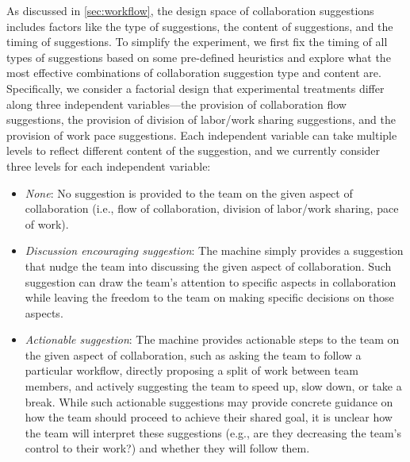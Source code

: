 As discussed in \ref{sec:workflow}, the design space of collaboration suggestions includes factors like the type of suggestions, the content of suggestions, and the timing of suggestions. To simplify the experiment, we first fix the timing of all types of suggestions based on some pre-defined heuristics and explore what the most effective combinations of collaboration suggestion type and content are. Specifically, we consider a factorial design that experimental treatments differ along three independent variables---the provision of collaboration flow suggestions, the provision of division of labor/work sharing suggestions, and the provision of work pace suggestions. Each independent variable can take multiple levels to reflect different content of the suggestion, and we currently consider three levels for each independent variable:
\begin{itemize}[leftmargin=*]
\item {\em None}: No suggestion is provided to the team on the given aspect of collaboration (i.e., flow of collaboration, division of labor/work sharing, pace of work).
\item {\em Discussion encouraging suggestion}: The machine simply provides a suggestion that nudge the team into discussing the given aspect of collaboration. %
Such suggestion can draw the team's attention to specific aspects in collaboration while leaving the freedom to the team on making specific decisions on those aspects.
\item {\em Actionable suggestion}: The machine provides actionable steps to the team on the given aspect of collaboration, such as asking the team to follow a particular workflow, directly proposing a split of work between team members, and actively suggesting the team to speed up, slow down, or take a break. While such actionable suggestions may provide concrete guidance on how the team should proceed to achieve their shared goal, it is unclear how the team will interpret these suggestions (e.g., are they decreasing the team's control to their work?) and whether they will follow them. 
\end{itemize}

